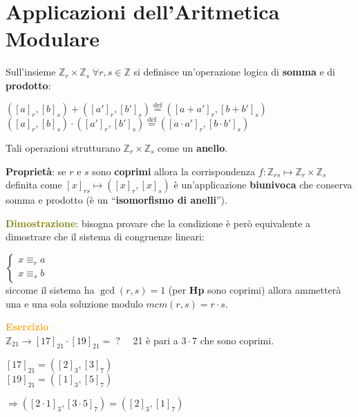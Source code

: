 \section{Applicazioni dell'Aritmetica Modulare}
\begin{flushleft}
    Sull'insieme $\mathbb{Z}_r \times \mathbb{Z}_s \; \forall r, s \in \mathbb{Z}$ si definisce un'operazione logica di \textbf{somma} e di \textbf{prodotto}: 

    {\centering
        $([a]_r, [b]_s) + ([a']_r, [b']_s) \overset{\text{def}}{=} ([a + a']_r, [b + b']_s)$ \\
        $([a]_r, [b]_s) \cdot ([a']_r, [b']_s) \overset{\text{def}}{=} ([a \cdot a']_r, [b \cdot b']_s)$
    \par}
    Tali operazioni strutturano $\mathbb{Z}_r \times \mathbb{Z}_s$ come un \textbf{anello}. 

    \textbf{Proprietà}: se $r$ e $s$ sono \textbf{coprimi} allora la corrispondenza $f: \mathbb{Z}_{rs} \mapsto \mathbb{Z}_r \times \mathbb{Z}_s$ definita come $[x]_{rs} \mapsto ([x]_r, [x]_s)$ è un'applicazione \textbf{biunivoca} che conserva somma e prodotto (è un ``\textbf{isomorfismo di anelli}'').

    \begin{boxA}
        \textcolor{olive}{\textbf{Dimostrazione}}: bisogna provare che  la condizione è però equivalente a dimostrare che il sistema di congruenze lineari:

        $\begin{cases}
            x \equiv_r a \\
            x \equiv_s b
        \end{cases}$ \\

        siccome il sistema ha $\gcd (r, s) = 1$ (per \textbf{Hp} sono coprimi) allora ammetterà una e una sola soluzione modulo $mcm(r, s) = r \cdot s$.
    \end{boxA}
    \begin{boxA}
        \textcolor{orange}{\textbf{Esercizio}} \\
        $\mathbb{Z}_{21} \rightarrow [17]_{21} \cdot [19]_{21} = \; ? \quad$ 21 è pari a $3 \cdot 7$ che sono coprimi.

        {\centering
            \begin{minipage}[t]{0.45\textwidth}
                $[17]_{21} = ([2]_3, [3]_7)$ \\
                $[19]_{21} = ([1]_3, [5]_7)$
            \end{minipage}
            \hfill
            \begin{minipage}[t]{0.45\textwidth}
                $\Rightarrow ([2 \cdot 1]_3, [3 \cdot 5]_7) = ([2]_3, [1]_7)$
            \end{minipage}
        \par}
        

\end{boxA}
\end{flushleft}
